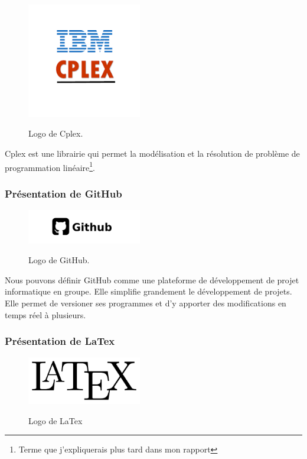 \begin{figure}[h]
  \begin{center}
  \includegraphics[width=5cm]{./images/cplex.png}\label{Cplex}
  \caption{Logo de Cplex.}
  \end{center}
\end{figure}

Cplex est une librairie qui permet la modélisation et la résolution de problème de programmation linéaire\footnote{Terme que j'expliquerais plus tard dans mon rapport}.

\subsubsection{Présentation de GitHub}

\begin{figure}[h]
  \begin{center}
  \includegraphics[width=5cm]{./images/github.jpg}\label{GitHub}
  \caption{Logo de GitHub.}
  \end{center}
\end{figure}


Nous pouvons définir GitHub comme une plateforme de développement de projet informatique en groupe. Elle simplifie grandement le développement de projets. Elle permet de versioner ses programmes et d'y apporter des modifications en temps réel à plusieurs.

\subsubsection{Présentation de LaTex}

\begin{figure}[h]
  \begin{center}
\includegraphics[width=5cm]{./images/Latex.png}\label{LaTex}
\caption{Logo de LaTex}
\end{center}
\end{figure}

